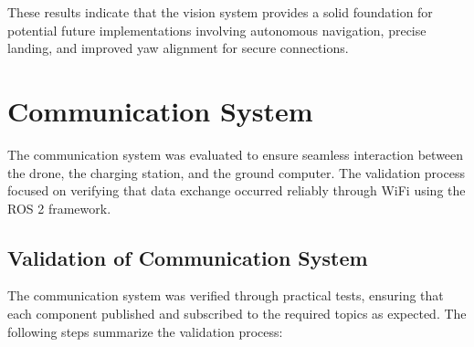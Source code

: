 These results indicate that the vision system provides a solid foundation for potential future implementations involving autonomous navigation, precise landing, and improved yaw alignment for secure connections.

\section{Communication System}

The communication system was evaluated to ensure seamless interaction between the drone, the charging station, and the ground computer. The validation process focused on verifying that data exchange occurred reliably through WiFi using the ROS 2 framework.

\subsection{Validation of Communication System}

The communication system was verified through practical tests, ensuring that each component published and subscribed to the required topics as expected. The following steps summarize the validation process:

